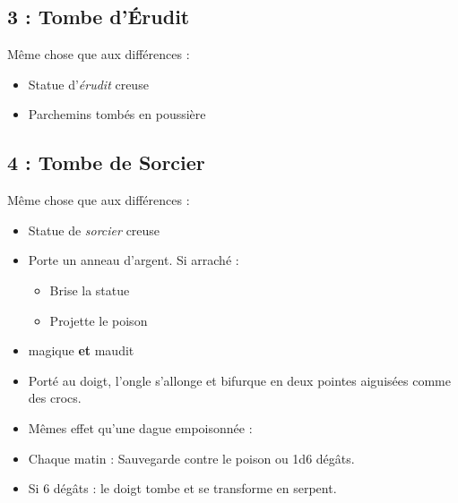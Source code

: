 \subsection{3 : Tombe d’Érudit}\label{n1:s3}
Même chose que \textbf{} aux différences :
\begin{itemize}
  \item Statue d'\emph{érudit} creuse
  \item Parchemins tombés en poussière
\end{itemize}

\subsection{4 : Tombe de Sorcier}\label{n1:s4}
Même chose que \textbf{} aux différences :
\begin{itemize}
  \item Statue de \emph{sorcier} creuse
  \item Porte un anneau d’argent. Si arraché :
  \begin{itemize}
    \item Brise la statue
    \item Projette le poison
  \end{itemize}
\end{itemize}

\begin{highlight}
  \begin{itemize}
    \item magique \textbf{et} maudit
    \item Porté au doigt, l’ongle s’allonge et bifurque en deux pointes aiguisées comme des crocs.
    \item Mêmes effet qu'une dague empoisonnée : 
    \item Chaque matin  : Sauvegarde contre le poison ou 1d6 dégâts.
    \item Si 6 dégâts :  le doigt tombe et se transforme en serpent.
  \end{itemize}
\end{highlight}


